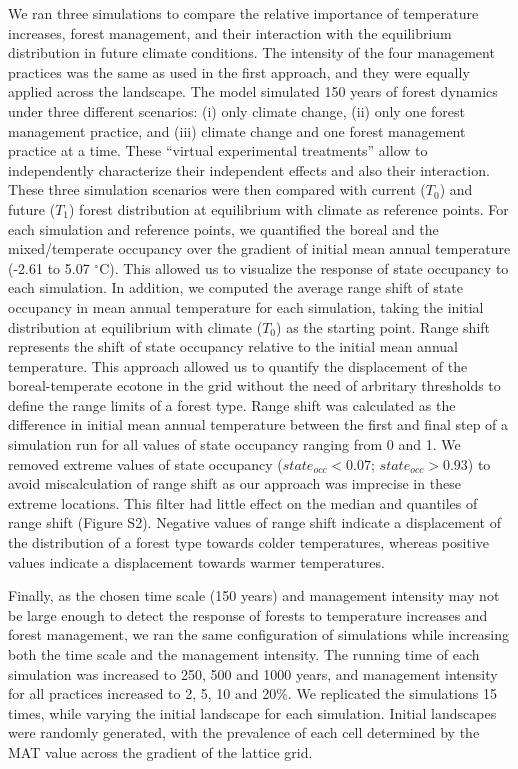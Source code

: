 \documentclass[12pt]{article}
\begin{document}
We ran three simulations to compare the relative importance of
temperature increases, forest management, and their interaction with the
equilibrium distribution in future climate conditions. The intensity of
the four management practices was the same as used in the first
approach, and they were equally applied across the landscape. The model
simulated 150 years of forest dynamics under three different scenarios:
(i) only climate change, (ii) only one forest management practice, and
(iii) climate change and one forest management practice at a time. These
``virtual experimental treatments'' allow to independently characterize
their independent effects and also their interaction. These three
simulation scenarios were then compared with current (\(T_0\)) and
future (\(T_1\)) forest distribution at equilibrium with climate as
reference points. For each simulation and reference points, we
quantified the boreal and the mixed/temperate occupancy over the
gradient of initial mean annual temperature (-2.61 to 5.07
\(^{\circ}\)C). This allowed us to visualize the response of state
occupancy to each simulation. In addition, we computed the average range
shift of state occupancy in mean annual temperature for each simulation,
taking the initial distribution at equilibrium with climate (\(T_0\)) as
the starting point. Range shift represents the shift of state occupancy
relative to the initial mean annual temperature. This approach allowed
us to quantify the displacement of the boreal-temperate ecotone in the
grid without the need of arbritary thresholds to define the range limits
of a forest type. Range shift was calculated as the difference in
initial mean annual temperature between the first and final step of a
simulation run for all values of state occupancy ranging from 0 and 1.
We removed extreme values of state occupancy (\(state_{occ} < 0.07\);
\(state_{occ} > 0.93\)) to avoid miscalculation of range shift as our
approach was imprecise in these extreme locations. This filter had
little effect on the median and quantiles of range shift (Figure S2).
Negative values of range shift indicate a displacement of the
distribution of a forest type towards colder temperatures, whereas
positive values indicate a displacement towards warmer temperatures.

Finally, as the chosen time scale (150 years) and management intensity
may not be large enough to detect the response of forests to temperature
increases and forest management, we ran the same configuration of
simulations while increasing both the time scale and the management
intensity. The running time of each simulation was increased to 250, 500
and 1000 years, and management intensity for all practices increased to
2, 5, 10 and 20\%. We replicated the simulations 15 times, while varying
the initial landscape for each simulation. Initial landscapes were
randomly generated, with the prevalence of each cell determined by the
MAT value across the gradient of the lattice grid.
\end{document}
